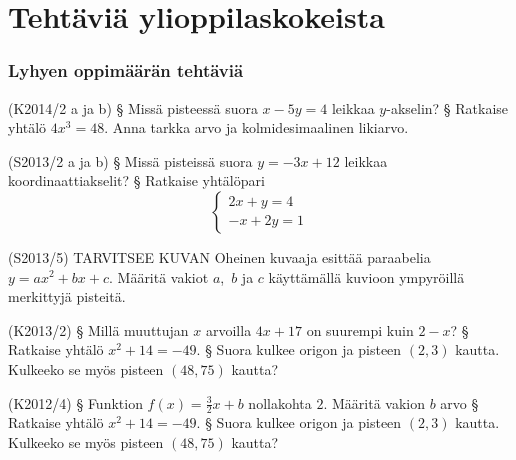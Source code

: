 \section{Tehtäviä ylioppilaskokeista}


\subsubsection*{Lyhyen oppimäärän tehtäviä}


\begin{tehtava} (K2014/2 a ja b)
\alakohdat
		§ Missä pisteessä suora $x-5y=4$ leikkaa $y$-akselin?
		§ Ratkaise yhtälö $4x^3=48$. Anna tarkka arvo ja kolmidesimaalinen likiarvo.
	\loppu
\end{tehtava}

\begin{tehtava}  (S2013/2 a ja b)
\alakohdat
		§ Missä pisteissä suora $y=-3x+12$ leikkaa koordinaattiakselit?
		§ Ratkaise yhtälöpari 
		\[
\left\{
\begin{aligned}
 2x+y=4  \\
 -x+2y=1  
\end{aligned}
\right. 
\]
	\loppu
\end{tehtava}

\begin{tehtava} (S2013/5) TARVITSEE KUVAN
Oheinen kuvaaja esittää paraabelia $y=ax^2+bx+c$. Määritä vakiot $a$, $b$ ja $c$ käyttämällä kuvioon ympyröillä merkittyjä pisteitä.
\end{tehtava}

\begin{tehtava} (K2013/2)
\alakohdat
		§ Millä muuttujan $x$ arvoilla $4x+17$ on suurempi kuin $2-x$?
		§ Ratkaise yhtälö $x^2+14=-49$.
		§ Suora kulkee origon ja pisteen $(2,3)$ kautta. Kulkeeko se myös pisteen $(48,75)$ kautta?
	\loppu
\end{tehtava}

\begin{tehtava} (K2012/4)
\alakohdat
		§ Funktion $f(x)=\frac{3}{2}x+b$ nollakohta $2$. Määritä vakion $b$ arvo
		§ Ratkaise yhtälö $x^2+14=-49$.
		§ Suora kulkee origon ja pisteen $(2,3)$ kautta. Kulkeeko se myös pisteen $(48,75)$ kautta?
	\loppu
\end{tehtava}


